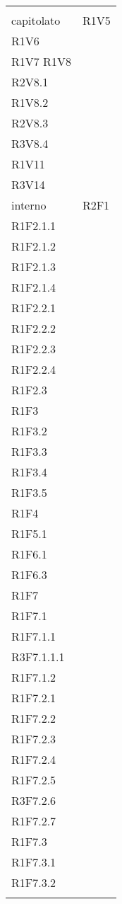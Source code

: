 \begin{longtable}{ >{\centering}p{}
		>{\centering}p{}}
	\tabularnewline
	\rowcolordark &	\tabularnewline
	 capitolato & R1V5 \\ R1V6 \\R1V7 R1V8 \\R2V8.1 \\R1V8.2 \\ R2V8.3 \\R3V8.4 \\R1V11 \\R3V14
	 
	\tabularnewline
	interno & R2F1 \\ R1F2.1.1 \\R1F2.1.2 \\R1F2.1.3 \\R1F2.1.4 \\R1F2.2.1 \\R1F2.2.2 \\R1F2.2.3 \\R1F2.2.4 \\R1F2.3 \\R1F3 \\R1F3.2 \\R1F3.3 \\R1F3.4 \\R1F3.5 \\R1F4 \\R1F5.1 \\R1F6.1 \\R1F6.3 \\R1F7 \\R1F7.1 \\R1F7.1.1 \\R3F7.1.1.1 \\R1F7.1.2 \\R1F7.2.1 \\R1F7.2.2 \\R1F7.2.3 \\R1F7.2.4 \\R1F7.2.5 \\R3F7.2.6 \\R1F7.2.7 \\R1F7.3 \\R1F7.3.1 \\R1F7.3.2 \tabularnewline \rowcolorlight &	\tabularnewline
		

\end{longtable}
